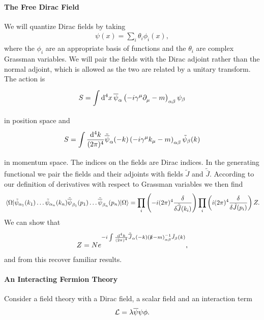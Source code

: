 \paragraph{The Free Dirac Field}
We will quantize Dirac fields by taking
\begin{align*}
	\psi(x) = \sum\limits_{i}\theta_{i}\phi_{i}(x),
\end{align*}
where the $\phi_{i}$ are an appropriate basis of functions and the $\theta_{i}$ are complex Grassman variables. We will pair the fields with the Dirac adjoint rather than the normal adjoint, which is allowed as the two are related by a unitary transform. The action is
\begin{align*}
	S = \int\limits_{}^{}\dd[4]{x}\overline{\psi}_{\alpha}\left(-i\gamma^{\mu}\partial^{}_{\mu} - m\right)_{\alpha\beta}\psi_{\beta}
\end{align*}
in position space and
\begin{align*}
	S = \int\limits_{}^{}\frac{\dd[4]{k}}{(2\pi)^{4}}\tilde{\overline{\psi}}_{\alpha}(-k)\left(-i\gamma^{\mu}k_{\mu} - m\right)_{\alpha\beta}\tilde{\psi}_{\beta}(k)
\end{align*}
in momentum space. The indices on the fields are Dirac indices. In the generating functional we pair the fields and their adjoints with fields $\tilde{J}$ and $\tilde{\overline{J}}$. According to our definition of derivatives with respect to Grassman variables we then find
\begin{align*}
	\expval{\tilde{\psi}_{\alpha_{1}}(k_{1})\dots\tilde{\psi}_{\alpha_{n}}(k_{n})\tilde{\overline{\psi}}_{\beta_{1}}(p_{1})\dots\tilde{\overline{\psi}}_{\beta_{n}}(p_{n})}{\Omega} = \prod\limits_{i}\left(-i(2\pi)^{4}\fdv{\tilde{\overline{J}}(k_{i})}\right)\prod\limits_{i}\left(i(2\pi)^{4}\fdv{\tilde{J}(p_{i})}\right)Z.
\end{align*}
We can show that
\begin{align*}
	Z = Ne^{-i\int\limits_{}^{}\frac{\dd[4]{k}}{(2\pi)^{4}}\tilde{\overline{J}}_{\alpha}(-k)(\slashed{k} - m)_{\alpha\beta}^{-1}\tilde{J}_{\beta}(k)},
\end{align*}
and from this recover familiar results.

\paragraph{An Interacting Fermion Theory}
Consider a field theory with a Dirac field, a scalar field and an interaction term
\begin{align*}
	\mathcal{L} = \lambda\overline{\psi}\psi\phi.
\end{align*}

